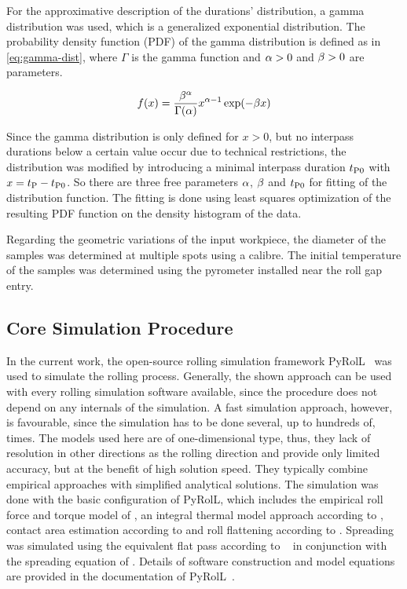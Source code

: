 For the approximative description of the durations' distribution, a gamma distribution was used, which is a generalized exponential distribution.
The probability density function (PDF) of the gamma distribution is defined as in \autoref{eq:gamma-dist}, where $\Gamma$ is the gamma function and ${\alpha} > 0$ and ${\beta} > 0$ are parameters.

\begin{equation}
    f(x) = \frac{{\beta}^{\alpha}}{\Gamma({\alpha})}x^{{\alpha} - 1} \exp(-{\beta} x)
    \label{eq:gamma-dist}
\end{equation}

Since the gamma distribution is only defined for $x>0$, but no interpass durations below a certain value occur due to technical restrictions, the distribution was modified by introducing a minimal interpass duration ${t_\mathrm{P0}}$ with $x = {t_\mathrm{P}} - {t_\mathrm{P0}}$.
So there are three free parameters ${\alpha}$, ${\beta}$ and ${t_\mathrm{P0}}$ for fitting of the distribution function.
The fitting is done using least squares optimization of the resulting PDF function on the density histogram of the data.

Regarding the geometric variations of the input workpiece, the diameter of the samples was determined at multiple spots using a calibre.
The initial temperature of the samples was determined using the pyrometer installed near the roll gap entry.

\subsection{Core Simulation Procedure}\label{subsec:simulation-procedure}

In the current work, the open-source rolling simulation framework PyRolL~\cite{pyroll2} was used to simulate the rolling process.
Generally, the shown approach can be used with every rolling simulation software available, since the procedure does not depend on any internals of the simulation.
A fast simulation approach, however, is favourable, since the simulation has to be done several, up to hundreds of, times.
The models used here are of one-dimensional type, thus, they lack of resolution in other directions as the rolling direction and provide only limited accuracy, but at the benefit of high solution speed.
They typically combine empirical approaches with simplified analytical solutions.
The simulation was done with the basic configuration of PyRolL, which includes the empirical roll force and torque model of \textcite{Hensel1978}, an integral thermal model approach according to \textcite{Hensel1990}, contact area estimation according to \textcite{Zouhar1960} and roll flattening according to \textcite{Hitchcock1935}.
Spreading was simulated using the equivalent flat pass according to \citeauthor*{Lendl1948}~\cite{Lendl1948, Lendl1948a, Lendl1949} in conjunction with the spreading equation of \textcite{Wusatowski1969}.
Details of software construction and model equations are provided in the documentation of PyRolL~\cite{pyroll}.

